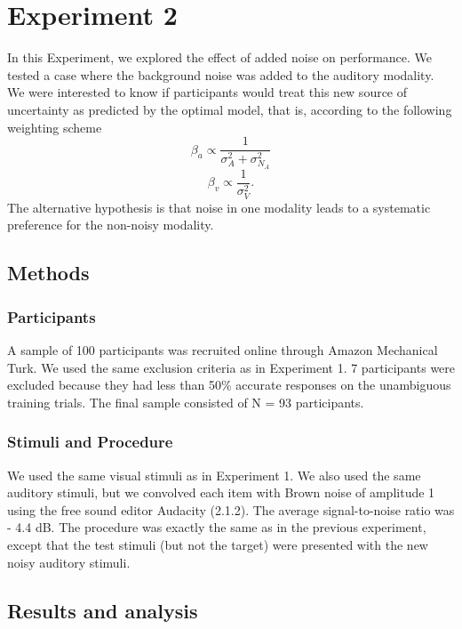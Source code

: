 \documentclass[english,floatsintext,man]{apa6}
\theoremstyle{definition}
\theoremstyle{definition}
\theoremstyle{definition}
\theoremstyle{remark}
\begin{document}
\section{Experiment 2}\label{experiment-2}

In this Experiment, we explored the effect of added noise on
performance. We tested a case where the background noise was added to
the auditory modality. We were interested to know if participants would
treat this new source of uncertainty as predicted by the optimal model,
that is, according to the following weighting scheme
\[\beta_a \propto \frac{1}{\sigma^2_{A}+\sigma^2_{N_A}}\]
\[\beta_v \propto \frac{1}{\sigma^2_{V}}.\] The alternative hypothesis
is that noise in one modality leads to a systematic preference for the
non-noisy modality.

\subsection{Methods}\label{methods-1}

\subsubsection{Participants}\label{participants-1}

A sample of 100 participants was recruited online through Amazon
Mechanical Turk. We used the same exclusion criteria as in Experiment 1.
7 participants were excluded because they had less than 50\% accurate
responses on the unambiguous training trials. The final sample consisted
of N = 93 participants.

\subsubsection{Stimuli and Procedure}\label{stimuli-and-procedure}

We used the same visual stimuli as in Experiment 1. We also used the
same auditory stimuli, but we convolved each item with Brown noise of
amplitude 1 using the free sound editor Audacity (2.1.2). The average
signal-to-noise ratio was - 4.4 dB. The procedure was exactly the same
as in the previous experiment, except that the test stimuli (but not the
target) were presented with the new noisy auditory stimuli.

\subsection{Results and analysis}\label{results-and-analysis-1}
\end{document}
